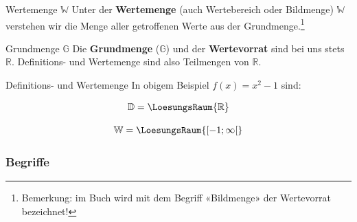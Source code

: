 \begin{definition}{Wertemenge $\mathbb{W}$}{}
Unter der \textbf{Wertemenge} (auch Wertebereich oder Bildmenge) $\mathbb{W}$
verstehen wir die Menge aller getroffenen Werte aus der
Grundmenge.\footnote{Bemerkung: im Buch \cite{marthaler21alg} wird
  mit dem Begriff «Bildmenge» der Wertevorrat bezeichnet!}
\end{definition}

\begin{definition}{Grundmenge $\mathbb{G}$}{}
Die \textbf{Grundmenge} ($\mathbb{G}$) und der \textbf{Wertevorrat}
sind bei uns stets $\mathbb{R}$. Definitions- und Wertemenge sind also
Teilmengen von $\mathbb{R}$.
  \end{definition}



\begin{beispiel}{Definitions- und Wertemenge}{}
  In obigem Beispiel $f(x) = x^2-1$ sind:

  \vspace{3mm}
  $$\mathbb{D} = \LoesungsRaum{\mathbb{R}}$$


  \vspace{3mm}
  $$\mathbb{W} = \LoesungsRaum{[-1; \infty{}[}$$

\end{beispiel}

\subsubsection*{Begriffe}

